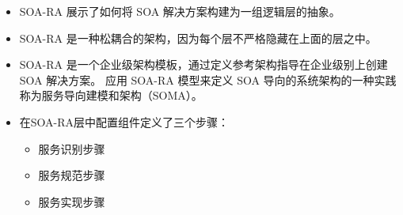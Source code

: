 \begin{itemize}
    \item SOA-RA 展示了如何将 SOA 解决方案构建为一组逻辑层的抽象。
    \item SOA-RA 是一种松耦合的架构，因为每个层不严格隐藏在上面的层之中。
    \item SOA-RA 是一个企业级架构模板，通过定义参考架构指导在企业级别上创建 SOA 解决方案。
    应用 SOA-RA 模型来定义 SOA 导向的系统架构的一种实践称为服务导向建模和架构（SOMA）。
    \item 在SOA-RA层中配置组件定义了三个步骤：
    \vspace{-0.8em}
    \begin{multicols}{3}
    \begin{itemize}
        \item 服务识别步骤
        \item 服务规范步骤
        \item 服务实现步骤
    \end{itemize}
    \end{multicols}
    \vspace{-1em}
\end{itemize}